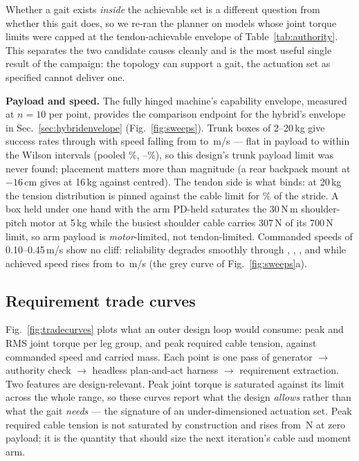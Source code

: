 \documentclass[conference]{IEEEtran}
\begin{document}
Whether a gait exists \emph{inside} the achievable set is a different question
from whether this gait does, so we re-ran the planner on models whose joint
torque limits were capped at the tendon-achievable envelope of
Table~\ref{tab:authority}. \eSixSummary{} This separates the two candidate
causes cleanly and is the most useful single result of the campaign: the
topology can support a gait, the actuation set as specified cannot deliver
one.

\textbf{Payload and speed.} The fully hinged machine's capability envelope,
measured at $n=10$ per point, provides the comparison endpoint for the
hybrid's envelope in Sec.~\ref{sec:hybridenvelope}
(Fig.~\ref{fig:sweeps}). Trunk boxes of 2--20\,kg give success rates
\cpayTwoRate{} through \cpayTwentyRate{} with speed falling from \cpayTwoV{}
to \cpayTwentyV\,m/s --- flat in payload to within the Wilson intervals
(pooled \cpayAllPct\%, \cpayAllCiLo--\cpayAllCiHi\%), so this design's trunk
payload limit was never found; placement matters more than magnitude (a rear
backpack mount at $-16$\,cm gives \rpaySixteenRate{} at 16\,kg against
\cpaySixteenRate{} centred). The tendon side is what binds: at 20\,kg the
tension distribution is pinned against the cable limit for \tensSatTwenty\%
of the stride. A box held under one hand with the arm PD-held saturates the
30\,N\,m shoulder-pitch motor at 5\,kg while the busiest shoulder cable
carries 307\,N of its 700\,N limit, so arm payload is \emph{motor}-limited,
not tendon-limited. Commanded speeds of 0.10--0.45\,m/s show no cliff:
reliability degrades smoothly through \spdTwentyRate{}, \spdThirtyRate{},
\spdThirtyFiveRate{}, \spdFortyRate{} and \spdFortyFiveRate{} while achieved
speed rises from \spdTwentyV{} to \spdFortyFiveV\,m/s (the grey curve of
Fig.~\ref{fig:sweeps}a).

\subsection{Requirement trade curves}
\label{sec:sweep}
Fig.~\ref{fig:tradecurves} plots what an outer design loop would consume: peak
and RMS joint torque per leg group, and peak required cable tension, against
commanded speed and carried mass. Each point is one pass of generator
$\rightarrow$ authority check $\rightarrow$ headless plan-and-act harness
$\rightarrow$ requirement extraction. Two features are design-relevant. Peak
joint torque is saturated against its limit across the whole range, so these
curves report what the design \emph{allows} rather than what the gait
\emph{needs} --- the signature of an under-dimensioned actuation set. Peak
required cable tension is not saturated by construction and rises from
\tensNeeded\,N at zero payload; it is the quantity that should size the next
iteration's cable and moment arm.
\end{document}
